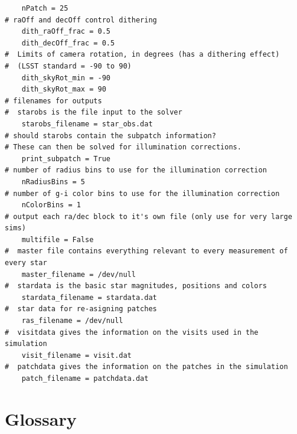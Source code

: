 \documentclass[12pt,preprint]{aastex}
\begin{document}
\begin{verbatim}
    nPatch = 25
# raOff and decOff control dithering
    dith_raOff_frac = 0.5
    dith_decOff_frac = 0.5
#  Limits of camera rotation, in degrees (has a dithering effect) 
#  (LSST standard = -90 to 90)
    dith_skyRot_min = -90
    dith_skyRot_max = 90
# filenames for outputs
#  starobs is the file input to the solver
    starobs_filename = star_obs.dat
# should starobs contain the subpatch information?  
# These can then be solved for illumination corrections.
    print_subpatch = True
# number of radius bins to use for the illumination correction
    nRadiusBins = 5
# number of g-i color bins to use for the illumination correction
    nColorBins = 1
# output each ra/dec block to it's own file (only use for very large sims)
    multifile = False
#  master file contains everything relevant to every measurement of every star
    master_filename = /dev/null
#  stardata is the basic star magnitudes, positions and colors
    stardata_filename = stardata.dat
#  star data for re-asigning patches
    ras_filename = /dev/null
#  visitdata gives the information on the visits used in the simulation
    visit_filename = visit.dat
#  patchdata gives the information on the patches in the simulation 
    patch_filename = patchdata.dat 
\end{verbatim}



\section{Glossary}
\label{sec:glossary}
\end{document}
